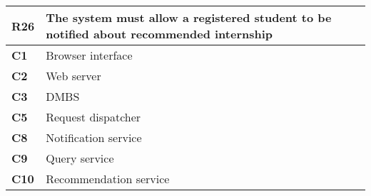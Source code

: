 \begin{table}[H]
    \centering
    \begin{tabular}{|l|m{10cm}|}
        \hline \textbf{R26} & The system must allow a registered student to be notified about recommended internship \\
        \hline \textbf{C1} & Browser interface \\
        \hline \textbf{C2} & Web server \\
        \hline \textbf{C3} & DMBS \\
        \hline \textbf{C5} & Request dispatcher \\
        \hline \textbf{C8} & Notification service \\
        \hline \textbf{C9} & Query service \\
        \hline \textbf{C10} & Recommendation service \\
        \hline
    \end{tabular}
\end{table}

